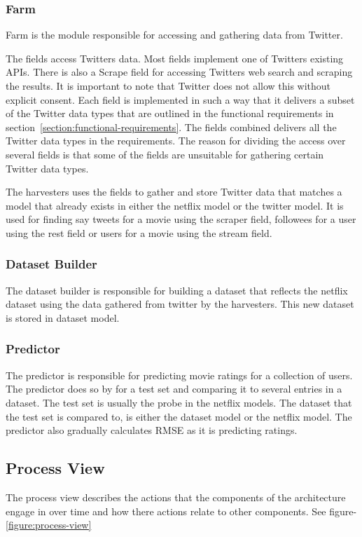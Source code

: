 \subsubsection{Farm}
Farm is the module responsible for accessing and gathering data from Twitter.

The fields access Twitters data. Most fields implement one of Twitters existing APIs. There is also a Scrape field for accessing Twitters web search and scraping the results. It is important to note that Twitter does not allow this without explicit consent. Each field is implemented in such a way that it delivers a subset of the Twitter data types that are outlined in the functional requirements in section~\ref{section:functional-requirements}. The fields combined delivers all the Twitter data types in the requirements. The reason for dividing the access over several fields is that some of the fields are unsuitable for gathering certain Twitter data types.

The harvesters uses the fields to gather and store Twitter data that matches a model that already exists in either the netflix model or the twitter model. It is used for finding say tweets for a movie using the scraper field, followees for a user using the rest field or users for a movie using the stream field.

\subsubsection{Dataset Builder}
The dataset builder is responsible for building a dataset that reflects the netflix dataset using the data gathered from twitter by the harvesters. This new dataset is stored in dataset model.

\subsubsection{Predictor}
The predictor is responsible for predicting movie ratings for a collection of users. The predictor does so by for a test set and comparing it to several entries in a dataset. The test set is usually the probe in the netflix models. The dataset that the test set is compared to, is either the dataset model or the netflix model. The predictor also gradually calculates RMSE as it is predicting ratings.

\subsection{Process View}
The process view describes the actions that the components of the architecture engage in over time and how there actions relate to other components. See figure-\ref{figure:process-view}

